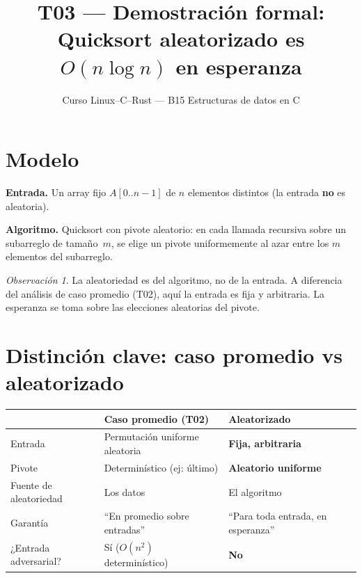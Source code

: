 \documentclass[11pt, letterpaper]{article}
\title{%
  T03 --- Demostración formal:\\[4pt]
  Quicksort aleatorizado es $O(n \log n)$ en esperanza
}
\author{Curso Linux--C--Rust --- B15 Estructuras de datos en C}
\date{}
\theoremstyle{definition}
\theoremstyle{plain}
\theoremstyle{remark}
\newtheorem{remark}{Observación}[section]
\begin{document}
\maketitle
\tableofcontents

\section{Modelo}

\textbf{Entrada.} Un array fijo $A[0..n{-}1]$ de $n$ elementos
distintos (la entrada \textbf{no} es aleatoria).

\textbf{Algoritmo.} Quicksort con pivote aleatorio: en cada llamada
recursiva sobre un subarreglo de tamaño~$m$, se elige un pivote
uniformemente al azar entre los $m$ elementos del subarreglo.

\begin{remark}
La aleatoriedad es del algoritmo, no de la entrada. A diferencia del
análisis de caso promedio (T02), aquí la entrada es fija y arbitraria.
La esperanza se toma sobre las elecciones aleatorias del pivote.
\end{remark}

\section{Distinción clave: caso promedio vs aleatorizado}

\begin{table}[h]
\centering
\begin{tabular}{lp{4.5cm}p{4.5cm}}
\toprule
& \textbf{Caso promedio (T02)} & \textbf{Aleatorizado} \\
\midrule
Entrada
  & Permutación uniforme aleatoria
  & \textbf{Fija, arbitraria} \\
Pivote
  & Determinístico (ej: último)
  & \textbf{Aleatorio uniforme} \\
Fuente de aleatoriedad
  & Los datos
  & El algoritmo \\
Garantía
  & ``En promedio sobre entradas''
  & ``Para toda entrada, en esperanza'' \\
¿Entrada adversarial?
  & Sí ($O(n^2)$ determinístico)
  & \textbf{No} \\
\bottomrule
\end{tabular}
\end{table}
\end{document}
